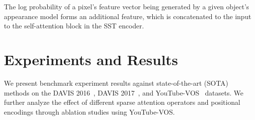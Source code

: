 The log probability of a pixel's feature vector being generated by a given
object's appearance model forms an additional feature, which is concatenated to
the input to the self-attention block in the SST encoder.








\section{Experiments and Results}
\label{sec:experiments}

We present benchmark experiment results against state-of-the-art (SOTA) methods
on the DAVIS 2016~\citep{perazzi2016abenchmark}, DAVIS
2017~\citep{ponttuset2017davis}, and YouTube-VOS~\citep{xu2018youtubevos}
datasets.
We further analyze the effect of different sparse attention operators and
positional encodings through ablation studies using YouTube-VOS\@.


